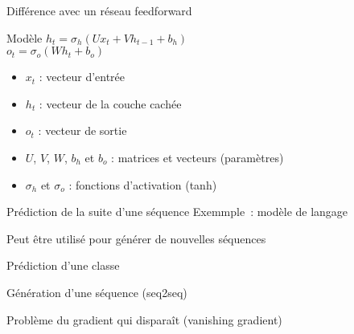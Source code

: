 \begin{frame}{Différence avec un réseau feedforward}
\end{frame}

\begin{frame}{Modèle}
  $h_{t}=\sigma_{h}(Ux_{t}+Vh_{t-1}+b_{h})$ \\
  $o_{t}=\sigma_{o}(Wh_{t}+b_{o})$ \\
  \begin{itemize}
  \item $x_{t}$ : vecteur d'entrée
  \item $h_t$ : vecteur de la couche cachée
  \item $o_{t}$ : vecteur de sortie
  \item $U$, $V$, $W$, $b_h$ et $b_o$ : matrices et vecteurs (paramètres)
  \item $\sigma_{h}$ et $\sigma_o$ : fonctions d'activation (tanh)
  \end{itemize}
\end{frame}

\begin{frame}{Prédiction de la suite d'une séquence}
  Exemmple~: modèle de langage


  Peut être utilisé pour générer de nouvelles séquences
\end{frame}

\begin{frame}{Prédiction d'une classe}
\end{frame}

\begin{frame}{Génération d'une séquence (seq2seq)}
\end{frame}

\begin{frame}{Problème du gradient qui disparaît (vanishing gradient)}
\end{frame}
